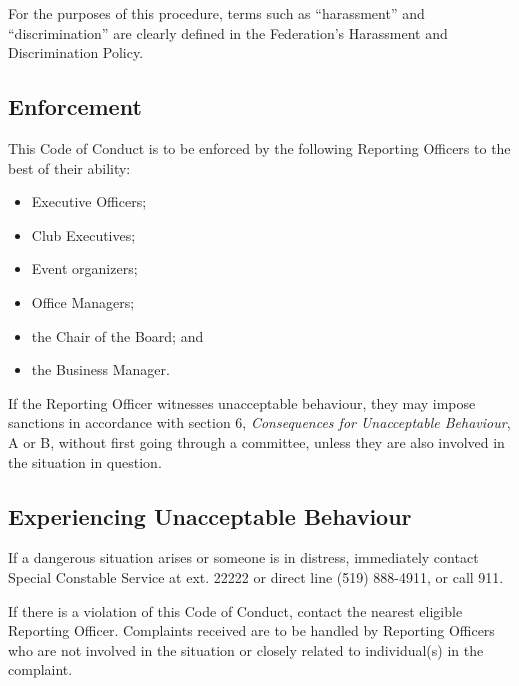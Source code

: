 For the purposes of this procedure, terms such as ``harassment'' and ``discrimination'' are clearly defined in the Federation's Harassment and Discrimination Policy.

\subsection{Enforcement}
This Code of Conduct is to be enforced by the following Reporting Officers to the best of their ability:
\begin{itemize}
	\item Executive Officers;
	\item Club Executives;
	\item Event organizers; 
	\item Office Managers;
	\item the Chair of the Board; and
	\item the Business Manager.
\end{itemize}
If the Reporting Officer witnesses unacceptable behaviour, they may impose sanctions in accordance with section 6, \textit{Consequences for Unacceptable Behaviour}, A or B, without first going through a committee, unless they are also involved in the situation in question.

\subsection{Experiencing Unacceptable Behaviour}
If a dangerous situation arises or someone is in distress, immediately contact Special Constable Service at ext. 22222 or direct line (519) 888-4911, or call 911.

If there is a violation of this Code of Conduct, contact the nearest eligible Reporting Officer. Complaints received are to be handled by Reporting Officers who are not involved in the situation or closely related to individual(s) in the complaint.

